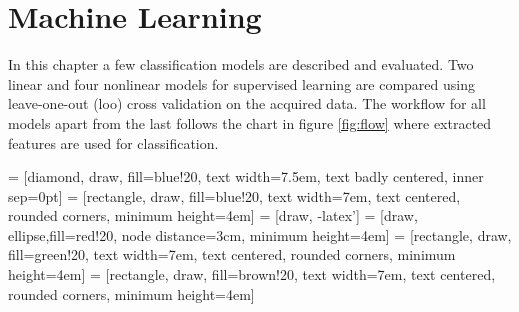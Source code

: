 \chapter{Machine Learning}

In this chapter a few classification models are described and evaluated. Two linear and four nonlinear models for supervised learning are compared using leave-one-out (\gls{loo}) cross validation on the acquired data. The workflow for all models apart from the last follows the chart in figure \ref{fig:flow} where extracted features are used for classification.

 = [diamond, draw, fill=blue!20, 
    text width=7.5em, text badly centered, inner sep=0pt]
 = [rectangle, draw, fill=blue!20, 
    text width=7em, text centered, rounded corners, minimum height=4em]
 = [draw, -latex']
 = [draw, ellipse,fill=red!20, node distance=3cm,
    minimum height=4em]
 = [rectangle, draw, fill=green!20, 
    text width=7em, text centered, rounded corners, minimum height=4em]
 = [rectangle, draw, fill=brown!20, 
    text width=7em, text centered, rounded corners, minimum height=4em]

